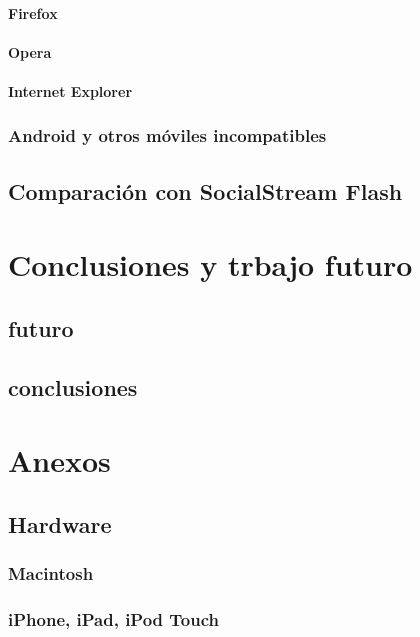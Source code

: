 		\subsubsection{Firefox}
		\subsubsection{Opera}
		\subsubsection{Internet Explorer}
	\subsection{Android y otros móviles incompatibles}
\section{Comparación con SocialStream Flash}

\chapter{Conclusiones y trbajo futuro}
	\section{futuro}
	\section{conclusiones}
	
	
\chapter{Anexos}
	\section{Hardware}
		\subsection{Macintosh}
		\subsection{iPhone, iPad, iPod Touch}
